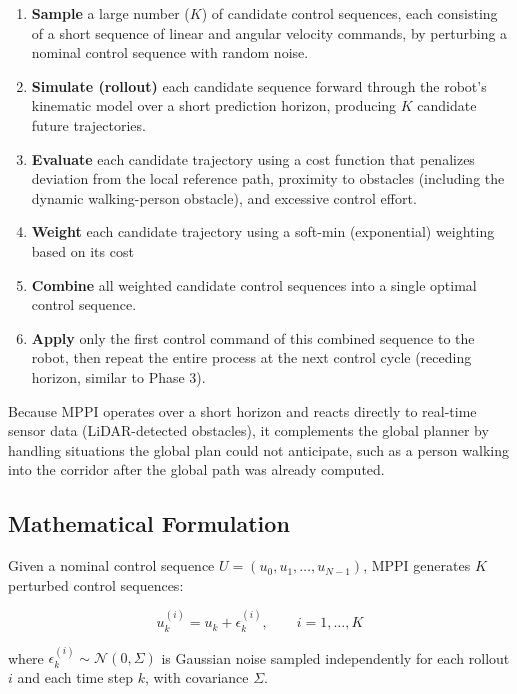 \begin{enumerate}[noitemsep]
	\item \textbf{Sample} a large number ($K$) of candidate control sequences, each consisting of a short sequence of linear and angular velocity commands, by perturbing a nominal control sequence with random noise.
	\item \textbf{Simulate (rollout)} each candidate sequence forward through the robot's kinematic model over a short prediction horizon, producing $K$ candidate future trajectories.
	\item \textbf{Evaluate} each candidate trajectory using a cost function that penalizes deviation from the local reference path, proximity to obstacles (including the dynamic walking-person obstacle), and excessive control effort.
	\item \textbf{Weight} each candidate trajectory using a soft-min (exponential) weighting based on its cost 
	\item \textbf{Combine} all weighted candidate control sequences into a single optimal control sequence.
	\item \textbf{Apply} only the first control command of this combined sequence to the robot, then repeat the entire process at the next control cycle (receding horizon, similar to Phase 3).
\end{enumerate}

Because MPPI operates over a short horizon and reacts directly to real-time sensor data (LiDAR-detected obstacles), it complements the global planner by handling situations the global plan could not anticipate, such as a person walking into the corridor after the global path was already computed.

\subsection{Mathematical Formulation}
\label{subsec:mppi_math}

Given a nominal control sequence $U = (u_0, u_1, \dots, u_{N-1})$, MPPI generates $K$ perturbed control sequences:

\begin{equation}
	u_k^{(i)} = u_k + \epsilon_k^{(i)}, \qquad i = 1, \dots, K
	\label{eq:mppi_perturbation}
\end{equation}

where $\epsilon_k^{(i)} \sim \mathcal{N}(0, \Sigma)$ is Gaussian noise sampled independently for each rollout $i$ and each time step $k$, with covariance $\Sigma$.

